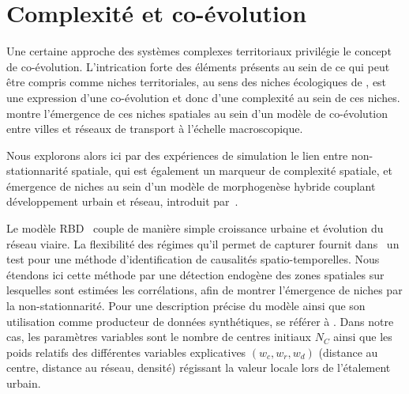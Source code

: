 \documentclass[11pt]{article}
\begin{document}



\section{Complexité et co-évolution}



Une certaine approche des systèmes complexes territoriaux privilégie le concept de co-évolution. L'intrication forte des éléments présents au sein de ce qui peut être compris comme niches territoriales, au sens des niches écologiques de \cite{holland2012signals}, est une expression d'une co-évolution et donc d'une complexité au sein de ces niches. \cite{raimbault2018modeling} montre l'émergence de ces niches spatiales au sein d'un modèle de co-évolution entre villes et réseaux de transport à l'échelle macroscopique.


Nous explorons alors ici par des expériences de simulation le lien entre non-stationnarité spatiale, qui est également un marqueur de complexité spatiale, et émergence de niches au sein d'un modèle de morphogenèse hybride couplant développement urbain et réseau, introduit par~\cite{raimbault2014hybrid}.

Le modèle RBD~\citep{raimbault2014hybrid} couple de manière simple croissance urbaine et évolution du réseau viaire. La flexibilité des régimes qu'il permet de capturer fournit dans~\cite{raimbault2017identification} un test pour une méthode d'identification de causalités spatio-temporelles. Nous étendons ici cette méthode par une détection endogène des zones spatiales sur lesquelles sont estimées les corrélations, afin de montrer l'émergence de niches par la non-stationnarité. Pour une description précise du modèle ainsi que son utilisation comme producteur de données synthétiques, se référer à \cite{raimbault2018caracterisation}. Dans notre cas, les paramètres variables sont le nombre de centres initiaux $N_C$ ainsi que les poids relatifs des différentes variables explicatives $(w_c,w_r,w_d)$ (distance au centre, distance au réseau, densité) régissant la valeur locale lors de l'étalement urbain.
\end{document}
